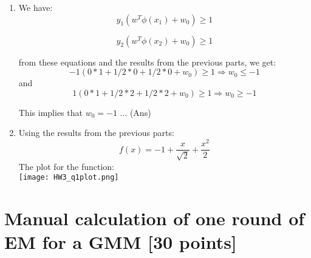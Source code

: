 \documentclass[letterpaper]{article}
\begin{document}
\begin{enumerate}
		\item We have:
		\begin{equation}
			y_1(w^T \phi(x_1) + w_0) \geq 1
			\label{eq:condit1}
		\end{equation}
		\vspace{-1cm}
		
		\begin{equation}
			y_2(w^T \phi(x_2) + w_0) \geq 1
			\label{eq:condit2}
		\end{equation}
		
		from these equations and the results from the previous parts, we get:
		\begin{equation}
			-1(0*1 + 1/2 * 0 + 1/2 * 0 + w_0) \geq 1 \Rightarrow w_0 \leq -1
		\end{equation}
		and
		\begin{equation}
			1(0*1 + 1/2 * 2 + 1/2 * 2 + w_0) \geq 1 \Rightarrow w_0 \geq -1
		\end{equation}
		
		This implies that  $w_0 = -1$  ... (Ans)
		
		\item Using the results from the previous parts:
		\begin{equation}
			f(x) = -1 + \frac{x}{\sqrt{2}} + \frac{x^2}{2}
		\end{equation}
		The plot for the function:\\
		\texttt{[image: HW3\_q1plot.png]}
	\end{enumerate}
	
	\section{Manual calculation of one round of EM for a GMM [30 points]}
\end{document}
